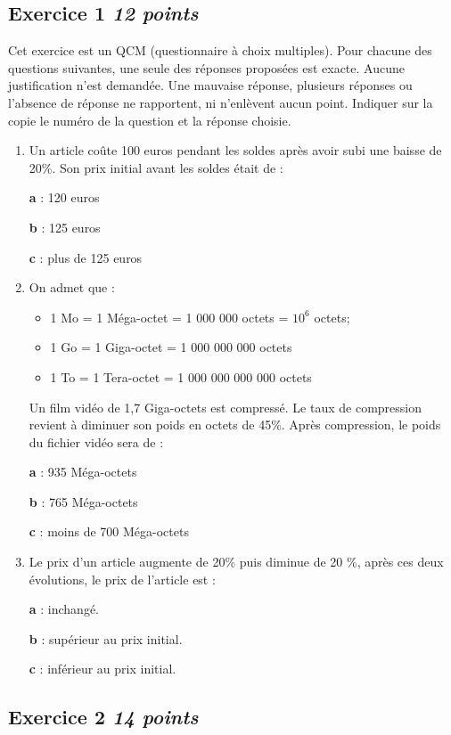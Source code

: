 \documentclass[10pt]{article}
\begin{document}
\subsection*{Exercice 1 \hfill \textit{12 points}}

Cet exercice est un QCM (questionnaire à choix multiples). Pour chacune des questions suivantes, une seule des réponses proposées est exacte. Aucune justification n’est demandée. Une mauvaise réponse, plusieurs réponses ou l’absence de réponse ne rapportent, ni n’enlèvent aucun point. Indiquer sur la copie le numéro de la question et la réponse choisie.

\begin{enumerate}
    \item Un article coûte 100 euros pendant les soldes après avoir subi une baisse de 20\%. Son prix initial avant les soldes était de : 

    \parbox{0.25\linewidth}{\textbf{a} : 120 euros}
    \parbox{0.35\linewidth}{\textbf{b} : 125 euros}
    \parbox{0.35\linewidth}{\textbf{c} : plus de 125 euros}
    \item On admet que :
    \begin{itemize}
        \item 1 Mo = 1 Méga-octet = 1 000 000 octets = $10^6$ octets;
        \item 1 Go = 1 Giga-octet = 1 000 000 000 octets
        \item 1 To = 1 Tera-octet = 1 000 000 000 000 octets
    \end{itemize} 
    Un film vidéo de 1,7 Giga-octets est compressé. Le taux de compression revient à diminuer son poids en octets de 45\%. Après compression, le poids du fichier vidéo sera de :

    \parbox{0.25\linewidth}{\textbf{a} : 935 Méga-octets}
    \parbox{0.35\linewidth}{\textbf{b} : 765 Méga-octets}
    \parbox{0.35\linewidth}{\textbf{c} : moins de 700 Méga-octets} 
    \item Le prix d’un article augmente de 20\% puis diminue de 20 \%, après ces deux évolutions, le prix de l’article est : 

    \parbox{0.25\linewidth}{\textbf{a} : inchangé.}
    \parbox{0.35\linewidth}{\textbf{b} : supérieur au prix initial.}
    \parbox{0.35\linewidth}{\textbf{c} : inférieur au prix initial.}   
\end{enumerate}


\subsection*{Exercice 2 \hfill \textit{14 points}}
\end{document}
